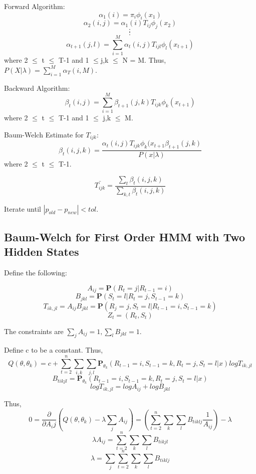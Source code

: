 \documentclass{article} %
\begin{document}
Forward Algorithm: \newline
$$\alpha_1(i) = \pi_i \phi_i(x_1)$$
$$\alpha_2(i,j) = \alpha_1(i) T_{ij} \phi_j(x_2)$$
$$:$$
$$:$$
$$\alpha_{t+1}(j, l) = \sum_{i=1}^M \alpha_t(i,j) T_{ijl} \phi_l(x_{t+1})$$
where 2 $\leq$ t $\leq$ T-1 and 1 $\leq$j,k $\leq$ N = M. \newline
Thus, $P(X | \lambda) = \sum_{i=1}^M \alpha_T(i,M)$. \newline

Backward Algorithm: \newline
$$\beta_t(i,j) = \sum_{i=1}^M \beta_{t+1}(j,k) T_{ijk} \phi_k(x_{t+1})$$
where 2 $\leq$ t $\leq$ T-1 and 1 $\leq$ j,k $\leq$ M. \newline

Baum-Welch Estimate for $T_{ijk}$: \newline
$$\beta_t(i,j,k) = \frac{\alpha_t(i,j) T_{ijk} \phi_k(x_{t+1} \beta_{t+1}(j,k)}{P(x|\lambda)}$$ 
where 2 $\leq$ t $\leq$ T-1. \newline

$$\bar{T_{ijk}} = \frac{\sum_t \beta_t (i,j,k)}{\sum_{k,t} \beta_t (i,j,k)}$$

Iterate until $|p_{old} - p_{new}| < tol$. 

\subsection{Baum-Welch for First Order HMM with Two Hidden States}

Define the following:

$$A_{ij} = \textbf{P} (R_t = j | R_{t-1} = i)$$
$$B_{jkl} = \textbf{P} (S_t = l | R_t = j, S_{t-1} = k)$$ 
$$T_{ik, jl} = A_{ij} B_{jkl} = \textbf{P} (R_j = j, S_t = l | R_{t-1} = i, S_{t-1} = k)$$
$$Z_t = (R_t, S_t)$$

The constraints are $\sum_j A_{ij} = 1, \sum_l B_{jkl} = 1.$ \newline

Define c to be a constant. Thus,  \newline
$$Q(\theta, \theta_k) = c + \sum_{t=2}^n \sum_{i,k} \sum_{j,l} \textbf{P}_{\theta_k} (R_{t-1} = i, S_{t-1} = k, R_t = j, S_t = l | x) log T_{ik, jl}$$ 
$$B_{tikjl} = \textbf{P}_{\theta_k} (R_{t-1} = i, S_{t-1} = k, R_t = j, S_t = l | x)$$
$$log T_{ik, jl} = log A_{ij} + log B_{jkl}$$

Thus, \newline
$$ 0 = \frac{\partial}{\partial A_ij}(Q(\theta, \theta_k) - \lambda \sum_{j} A_{ij}) = (\sum_{t=2}^n \sum_k \sum_l B_{tiklj} \frac{1}{A_{ij}}) - \lambda$$
$$\lambda A_{ij} = \sum_{t=2}^n \sum_k \sum_l B_{tikjl}$$
$$\lambda = \sum_j \sum_{t=2}^n \sum_k \sum_l B_{tiklj}$$
\end{document}
